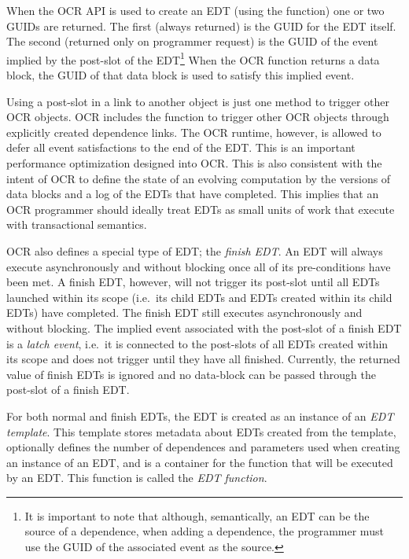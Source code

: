 When the OCR API is used to create an EDT (using the  function)
one or two GUIDs are returned. The first (always returned) is the GUID
for the EDT itself. The second (returned only on programmer request)
is the GUID of the event implied by the post-slot of the EDT\footnote{It is important to
note that although, semantically, an EDT can be the source of a
dependence, when adding a dependence, the programmer must use the
GUID of the associated event as the source.}
When the OCR function returns a data block, the GUID of
that data block is used to satisfy this implied event.

Using a post-slot in a link to another object is just one method to
trigger other OCR objects. OCR includes the 
function to trigger other OCR objects through explicitly created dependence
links. The OCR runtime, however, is allowed to defer all event satisfactions
to the end of the EDT. This is an important performance optimization designed
into OCR. This is also consistent with the intent of OCR to define the state
of an evolving computation by the versions of data blocks and a log of the
EDTs that have completed. This implies that an OCR programmer should
ideally treat EDTs as small units of work that execute with transactional
semantics.

OCR also defines a special type of EDT; the \emph{finish
EDT}. An EDT will always execute asynchronously and
without blocking once all of its pre-conditions have been met. A
finish EDT, however, will not trigger its post-slot until all EDTs
launched within its scope (i.e.\ its child EDTs and EDTs created
within its child EDTs) have completed. The finish EDT still executes
asynchronously and without blocking. The implied event associated with
the post-slot of a finish EDT is a \emph{latch event}, i.e.\ it is
connected to the post-slots of all EDTs created within its scope and
does not trigger until they have all finished. Currently, the returned
value of finish EDTs is ignored and no data-block can be passed
through the post-slot of a finish EDT.

For both normal and finish EDTs, the EDT is created as an
instance of an \emph{EDT template}. This template stores metadata about EDTs created from the
template, optionally defines the number of dependences and parameters
used when creating an instance of an EDT, and is a container for the
function that will be executed by an EDT. This function is called the
\emph{EDT function}.

